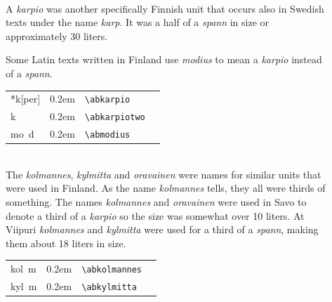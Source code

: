 \documentclass[a4paper]{article}
\newcommand{\samplefont}{\fontsize{16}{16}\abcursivefamily\spaceskip0.2em}
\newcommand{\sample}[1]{{\samplefont #1 \strut}}
\newcommand{\ltxncmd}[1]{\texttt{\textbackslash{}#1}}
\begin{document}
\begin{description}
\item [\sample{\abkarpio} \emph{karp}, \emph{karpio}] \mbox{} \\
  A \emph{karpio} was another specifically Finnish unit that occurs
  also in Swedish texts under the name \emph{karp}. It was a half of a
  \emph{spann} in size or approximately 30 liters.

  Some Latin texts written in Finland use \emph{modius} to mean a
  \emph{karpio} instead of a \emph{spann}.
  \begin{center}
    \begin{tabular}{llll}
      {}*k[per]  & \sample{\abkarpio} & \ltxncmd{abkarpio} \\
      {}k        & \sample{\abkarpiotwo} & \ltxncmd{abkarpiotwo} \\
      {}mo~d & \sample{\abmodius} & \ltxncmd{abmodius}    \\
    \end{tabular}
  \end{center}
  


\item [\sample{\abkolmannes} \sample{\abkylmitta} \emph{kolmannes},
  \emph{kylmitta}, \emph{oravainen}] \mbox{} \\
  The \emph{kolmannes}, \emph{kylmitta} and \emph{oravainen} were
  names for similar units that were used in Finland. As the name
  \emph{kolmannes} tells, they all were thirds of something. The names
  \emph{kolmannes} and \emph{oravainen} were used in Savo to denote a
  third of a \emph{karpio} so the size was somewhat over 10 liters. At
  Viipuri \emph{kolmannes} and \emph{kylmitta} were used for a third
  of a \emph{spann}, making them about 18 liters in size.
  \begin{center}
    \begin{tabular}{llll}
      {}kol~m  & \sample{\abkolmannes} & \ltxncmd{abkolmannes} \\
      {}kyl~m & \sample{\abkylmitta} & \ltxncmd{abkylmitta}    \\
    \end{tabular}
  \end{center}



\end{description}
\end{document}
